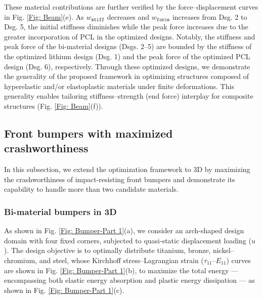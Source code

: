 \documentclass[preprint,11pt]{elsarticle}
\theoremstyle{definition}
\begin{document}
These material contributions are further verified by the force--displacement curves in Fig. \ref{Fig: Beam}(e). As $w_\texttt{stiff}$ decreases and $w_\texttt{force}$ increases from Dsg. 2 to Dsg. 5, the initial stiffness diminishes while the peak force increases due to the greater incorporation of PCL in the optimized designs. Notably, the stiffness and peak force of the bi-material designs (Dsgs. 2--5) are bounded by the stiffness of the optimized lithium design (Dsg. 1) and the peak force of the optimized PCL design (Dsg. 6), respectively. Through these optimized designs, we demonstrate the generality of the proposed framework in optimizing structures composed of hyperelastic and/or elastoplastic materials under finite deformations. This generality enables tailoring stiffness--strength (end force) interplay for composite structures (Fig. \ref{Fig: Beam}(f)).

\subsection{Front bumpers with maximized crashworthiness}

In this subsection, we extend the optimization framework to 3D by maximizing the crashworthiness of impact-resisting front bumpers \citep{patel_crashworthiness_2009, sun_crashworthiness_2018, wang_structure_2018, ren_effective_2020, wang_multi-objective_2020} and demonstrate its capability to handle more than two candidate materials.

\subsubsection{Bi-material bumpers in 3D}

As shown in Fig. \ref{Fig: Bumper-Part 1}(a), we consider an arch-shaped design domain with four fixed corners, subjected to quasi-static displacement loading ($u$). The design objective is to optimally distribute titanium, bronze, nickel--chromium, and steel, whose Kirchhoff stress--Lagrangian strain ($\tau_{11}$--$E_{11}$) curves are shown in Fig. \ref{Fig: Bumper-Part 1}(b), to maximize the total energy --- encompassing both elastic energy absorption and plastic energy dissipation --- as shown in Fig. \ref{Fig: Bumper-Part 1}(c).
\end{document}

